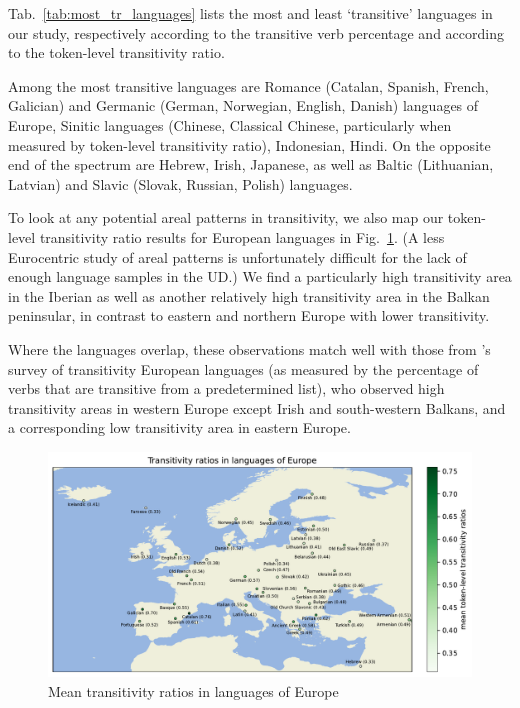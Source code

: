 

Tab.~\ref{tab:most_tr_languages} lists the most and least `transitive' languages in our study, respectively according to the transitive verb percentage and according to the token-level transitivity ratio.  

Among the most transitive languages are Romance (Catalan, Spanish, French, Galician) and Germanic (German, Norwegian, English, Danish) languages of Europe, Sinitic languages (Chinese, Classical Chinese, particularly when measured by token-level transitivity ratio), Indonesian, Hindi. On the opposite end of the spectrum are Hebrew, Irish, Japanese, as well as Baltic (Lithuanian, Latvian) and Slavic (Slovak, Russian, Polish) languages.

To look at any potential areal patterns in transitivity, we also map our token-level transitivity ratio results for European languages in Fig.~\ref{fig:transitivity_europe}. (A less Eurocentric study of areal patterns is unfortunately difficult for the lack of enough language samples in the UD.) We find a particularly high transitivity area in the Iberian as well as another relatively high transitivity area in the Balkan peninsular, in contrast to eastern and northern Europe with lower transitivity.

Where the languages overlap, these observations match well with those from \citet{say2014}'s survey of transitivity European languages (as measured by the percentage of verbs that are transitive from a predetermined list), who observed high transitivity areas in western Europe except Irish and south-western Balkans, and a corresponding low transitivity area in eastern Europe.

\begin{figure}
  \centering
  \includegraphics[width=\textwidth]{figures/transitivity_europe.pdf}
  \caption{Mean transitivity ratios in languages of Europe}
  \label{fig:transitivity_europe}
\end{figure}



